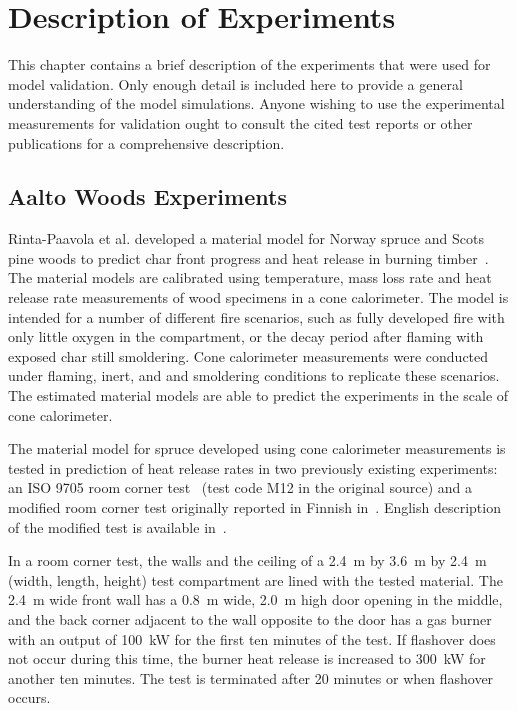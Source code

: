
\chapter{Description of Experiments}

\label{Experiments_Chapter}

This chapter contains a brief description of the experiments that were used for model validation. Only enough detail is included here to provide a general understanding of the model simulations. Anyone wishing to use the experimental measurements for validation ought to consult the cited test reports or other publications for a comprehensive description.


\section{Aalto Woods Experiments}
\label{Aalto_Woods_Description}

Rinta-Paavola et al. developed a material model for Norway spruce and Scots pine woods to predict char front progress and heat release in burning timber~\cite{Rinta-Paavola:2023}. The material models are calibrated using temperature, mass loss rate and heat release rate measurements of wood specimens in a cone calorimeter. The model is intended for a number of different fire scenarios, such as fully developed fire with only little oxygen in the compartment, or the decay period after flaming with exposed char still smoldering. Cone calorimeter measurements were conducted under flaming, inert, and and smoldering conditions to replicate these scenarios. The estimated material models are able to predict the experiments in the scale of cone calorimeter.

The material model for spruce developed using cone calorimeter measurements is tested in prediction of heat release rates in two previously existing experiments: an ISO 9705 room corner test~\cite{Sundstrom:1998} (test code M12 in the original source) and a modified room corner test originally reported in Finnish in~\cite{Hietaniemi:2001}. English description of the modified test is available in~\cite{Hietaniemi:1}.

In a room corner test, the walls and the ceiling of a 2.4~m by 3.6~m by 2.4~m (width, length, height) test compartment are lined with the tested material. The 2.4~m wide front wall has a 0.8~m wide, 2.0~m high door opening in the middle, and the back corner adjacent to the wall opposite to the door has a gas burner with an output of 100~kW for the first ten minutes of the test. If flashover does not occur during this time, the burner heat release is increased to 300~kW for another ten minutes. The test is terminated after 20 minutes or when flashover occurs.

